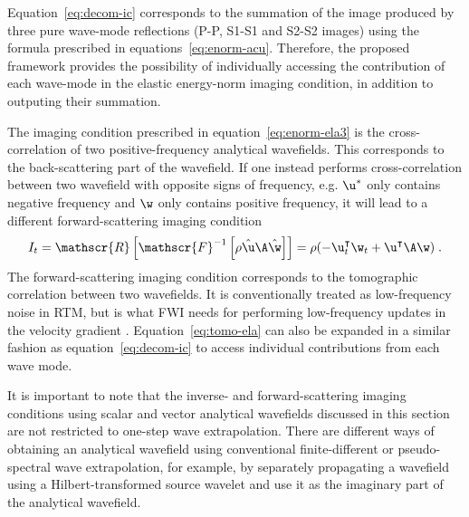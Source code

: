 Equation~\ref{eq:decom-ic} corresponds to the summation of the image produced by three pure wave-mode reflections (P-P, S1-S1 and S2-S2 images) using the formula prescribed in equations~\ref{eq:enorm-acu}. Therefore, the proposed framework provides the possibility of individually accessing the contribution of each wave-mode in the elastic energy-norm imaging condition, in addition to outputing their summation.

The imaging condition prescribed in equation~\ref{eq:enorm-ela3} is the cross-correlation of two positive-frequency analytical wavefields. This corresponds to the back-scattering part of the wavefield. If one instead performs cross-correlation between two wavefield with opposite signs of frequency, e.g. $\u^*$ only contains negative frequency and $\w$ only contains positive frequency, it will lead to a different forward-scattering imaging condition
\begin{equation}
    \label{eq:tomo-ela}
    I_t = \mathscr{R}\left[ \mathscr{F}^{-1} \left[ \rho \hat{\u} \A \hat{\w} \right] \right] = \rho ( -\u_t^\intercal \w_t + \u^\intercal \A \w ) \;.
\end{equation}
The forward-scattering imaging condition corresponds to the tomographic correlation between two wavefields. It is conventionally treated as low-frequency noise in RTM, but is what FWI needs for performing low-frequency updates in the velocity gradient \cite{diaz12,diaz13,ramos16}. Equation~\ref{eq:tomo-ela} can also be expanded in a similar fashion as equation~\ref{eq:decom-ic} to access individual contributions from each wave mode.

It is important to note that the inverse- and forward-scattering imaging conditions using scalar and vector analytical wavefields discussed in this section are not restricted to one-step wave extrapolation. There are different ways of obtaining an analytical wavefield using conventional finite-different or pseudo-spectral wave extrapolation, for example, by separately propagating a wavefield using a Hilbert-transformed source wavelet \cite[]{shen15,hu16} and use it as the imaginary part of the analytical wavefield.

\begin{comment}
\subsection{Attenuation}
One key advantage of the one-step scheme (equation~\ref{eq:os}) is that attenuation can be directly incorporated into the diagonal matrix of eigenvalues, by simply modifying the phase velocity and adding an amplitude decay term. The reasoning follows from a complex stiffness tensor $\widehat{\C} = \C + i\mathbf{M}$.
\end{comment}

